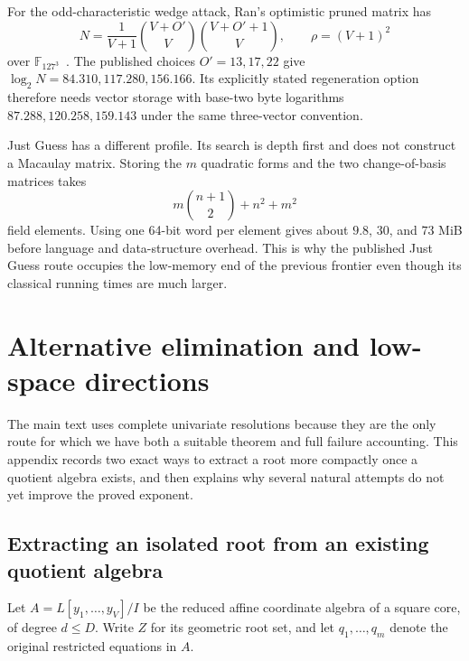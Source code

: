 \documentclass[11pt,a4paper]{article}
\theoremstyle{definition}
\theoremstyle{remark}
\newcommand{\F}{\mathbb F}
\begin{document}
For the odd-characteristic wedge attack, Ran's optimistic pruned matrix has
\[
 N=\frac{1}{V+1}
 \binom{V+O'}{V}\binom{V+O'+1}{V},
 \qquad \rho=(V+1)^2
\]
over $\F_{127^3}$~\cite{RanWedges}.  The published choices
$O'=13,17,22$ give $\log_2N=84.310,117.280,156.166$.  Its explicitly stated
regeneration option therefore needs vector storage with base-two byte
logarithms $87.288,120.258,159.143$ under the same three-vector convention.

Just Guess has a different profile.  Its search is depth first and does not
construct a Macaulay matrix.  Storing the $m$ quadratic forms and the two
change-of-basis matrices takes
\[
 m\binom{n+1}{2}+n^2+m^2
\]
field elements.  Using one 64-bit word per element gives about $9.8$, $30$,
and $73$ MiB before language and data-structure overhead.  This is why the
published Just Guess route occupies the low-memory end of the previous
frontier even though its classical running times are much larger.

\section{Alternative elimination and low-space directions}\label{app:alternatives}

The main text uses complete univariate resolutions because they are the only route for which we have both a suitable theorem and full failure accounting.  This appendix records two exact ways to extract a root more compactly once a quotient algebra exists, and then explains why several natural attempts do not yet improve the proved exponent.

\subsection{Extracting an isolated root from an existing quotient algebra}\label{subsec:implicit-extraction}

Let $A=L[y_1,\ldots,y_V]/I$ be the reduced affine coordinate algebra of a square core, of degree $d\le D$.  Write $Z$ for its geometric root set, and let $q_1,\ldots,q_m$ denote the original restricted equations in $A$.
\end{document}
